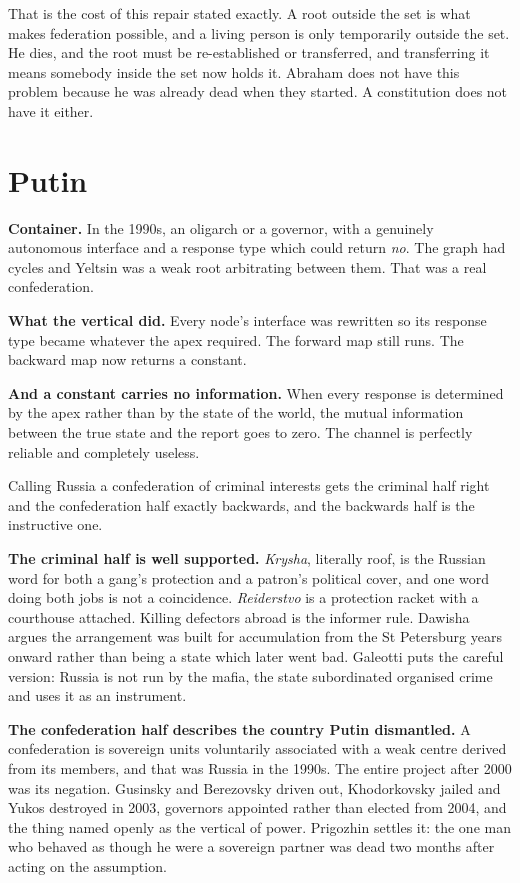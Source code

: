 \documentclass[11pt,a4paper]{article}
\begin{document}
That is the cost of this repair stated exactly. A root outside the set is what
makes federation possible, and a living person is only temporarily outside the set.
He dies, and the root must be re-established or transferred, and transferring it
means somebody inside the set now holds it. Abraham does not have this problem
because he was already dead when they started. A constitution does not have it
either.

\section{Putin}

\begin{sectionbox}
\textbf{Container.} In the 1990s, an oligarch or a governor, with a genuinely
autonomous interface and a response type which could return \emph{no}. The graph
had cycles and Yeltsin was a weak root arbitrating between them. That was a real
confederation.

\textbf{What the vertical did.} Every node's interface was rewritten so its response
type became whatever the apex required. The forward map still runs. The backward
map now returns a constant.

\textbf{And a constant carries no information.} When every response is determined by
the apex rather than by the state of the world, the mutual information between the
true state and the report goes to zero. The channel is perfectly reliable and
completely useless.
\end{sectionbox}

Calling Russia a confederation of criminal interests gets the criminal half right
and the confederation half exactly backwards, and the backwards half is the
instructive one.

\textbf{The criminal half is well supported.} \emph{Krysha}, literally roof, is the
Russian word for both a gang's protection and a patron's political cover, and one
word doing both jobs is not a coincidence. \emph{Reiderstvo} is a protection racket
with a courthouse attached. Killing defectors abroad is the informer rule. Dawisha
argues the arrangement was built for accumulation from the St Petersburg years
onward rather than being a state which later went bad. Galeotti puts the careful
version: Russia is not run by the mafia, the state subordinated organised crime and
uses it as an instrument.

\textbf{The confederation half describes the country Putin dismantled.} A
confederation is sovereign units voluntarily associated with a weak centre derived
from its members, and that was Russia in the 1990s. The entire project after 2000
was its negation. Gusinsky and Berezovsky driven out, Khodorkovsky jailed and Yukos
destroyed in 2003, governors appointed rather than elected from 2004, and the thing
named openly as the vertical of power. Prigozhin settles it: the one man who
behaved as though he were a sovereign partner was dead two months after acting on
the assumption.
\end{document}
